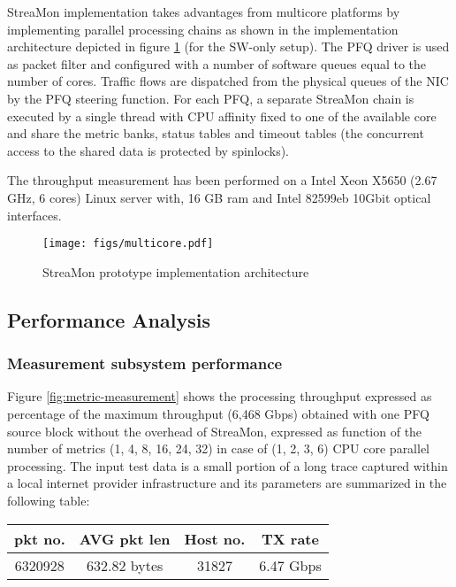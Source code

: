 \documentclass[conference,letterpaper]{sig-alternate-10pt}
\begin{document}
StreaMon implementation takes advantages from multicore platforms by implementing parallel processing chains as shown in the implementation architecture depicted in figure \ref{fig:multicore} (for the SW-only setup). The PFQ driver is used as packet filter and configured with a number of software queues equal to the number of cores. Traffic flows are dispatched from the physical queues of the NIC by the PFQ steering function. For each PFQ, a separate StreaMon chain is executed by a single thread with CPU affinity fixed to one of the available core and share the metric banks, status tables and timeout tables (the concurrent access to the shared data is protected by spinlocks).  

The throughput measurement has been performed on a Intel Xeon X5650 (2.67 GHz, 6 cores) Linux server with, 16 GB ram and Intel 82599eb 10Gbit optical interfaces.

\begin{figure}[!t]
\centering
   \texttt{[image: figs/multicore.pdf]}
\caption{StreaMon prototype implementation architecture}
\label{fig:multicore}
\end{figure}

\subsection{Performance Analysis}
\label{s:perf}
\subsubsection{Measurement subsystem performance} 
Figure \ref{fig:metric-measurement} shows the processing throughput expressed as percentage of the maximum throughput (6,468 Gbps) obtained with one PFQ source block without the overhead of StreaMon, expressed as function of the number of metrics (1, 4, 8, 16, 24, 32) in case of (1, 2, 3, 6) CPU core parallel processing. The input test data is a small portion of a long trace captured within a local internet provider infrastructure and its parameters are summarized in the following table:

\begin{center}
\begin{footnotesize}
\begin{tabular}{ | c | c | c |  c |}
\hline
\textbf{pkt no.} & \textbf{AVG pkt len} & \textbf{Host no.} & \textbf{TX rate}\\
\hline
6320928 & 632.82 bytes & 31827 & 6.47 Gbps \\
\hline
\end{tabular}
\end{footnotesize}
\end{center}
\end{document}
